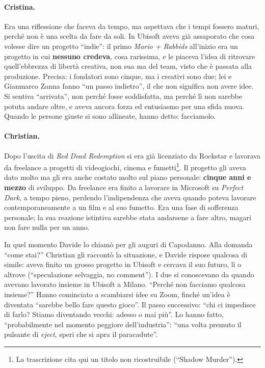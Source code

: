 \paragraph{Cristina.} Era una riflessione che faceva da tempo, ma aspettava che i
tempi fossero maturi, perché non è una scelta da fare da soli. In Ubisoft aveva già
assaporato che cosa volesse dire un progetto ``indie'': il primo \emph{Mario +
Rabbids} all'inizio era un progetto in cui \textbf{nessuno credeva}, cosa rarissima,
e le piaceva l'idea di ritrovare quell'ebbrezza di libertà creativa, non sua ma del
team, visto che è passata alla produzione. Precisa: i fondatori sono cinque, ma i
creativi sono due; lei e Gianmarco Zanna fanno ``un passo indietro'', il che non
significa non avere idee. Si sentiva ``arrivata'', non perché fosse soddisfatta, ma
perché lì non sarebbe potuta andare oltre, e aveva ancora forza ed entusiasmo per una
sfida nuova. Quando le persone giuste si sono allineate, hanno detto: facciamolo.

\paragraph{Christian.} Dopo l'uscita di \emph{Red Dead Redemption} si era già
licenziato da Rockstar e lavorava da freelance a progetti di videogiochi, cinema e
fumetti\footnote{La trascrizione cita qui un titolo non ricostruibile (``Shadow
Murder'').}. Il progetto gli aveva dato molto ma gli era anche costato molto sul
piano personale: \textbf{cinque anni e mezzo} di sviluppo. Da freelance era finito
a lavorare in Microsoft su \emph{Perfect Dark}, a tempo pieno, perdendo
l'indipendenza che aveva quando poteva lavorare contemporaneamente a un film e al
suo fumetto. Era una fase di sofferenza personale; la sua reazione istintiva sarebbe
stata andarsene a fare altro, magari non fare nulla per un anno.

In quel momento Davide lo chiamò per gli auguri di Capodanno. Alla domanda ``come
stai?'' Christian gli raccontò la situazione, e Davide rispose qualcosa di simile:
aveva finito un grosso progetto in Ubisoft e cercava il suo futuro, lì o altrove
(``speculazione selvaggia, no comment''). I due si conoscevano da quando avevano
lavorato insieme in Ubisoft a Milano. ``Perché non facciamo qualcosa insieme?''
Hanno cominciato a scambiarsi idee su Zoom, finché un'idea è diventata ``sarebbe
bello fare questo gioco''. Il passo successivo: ``chi ci impedisce di farlo? Stiamo
diventando vecchi: adesso o mai più''. Lo hanno fatto, ``probabilmente nel momento
peggiore dell'industria'': ``una volta premuto il pulsante di \emph{eject}, speri
che si apra il paracadute''.

